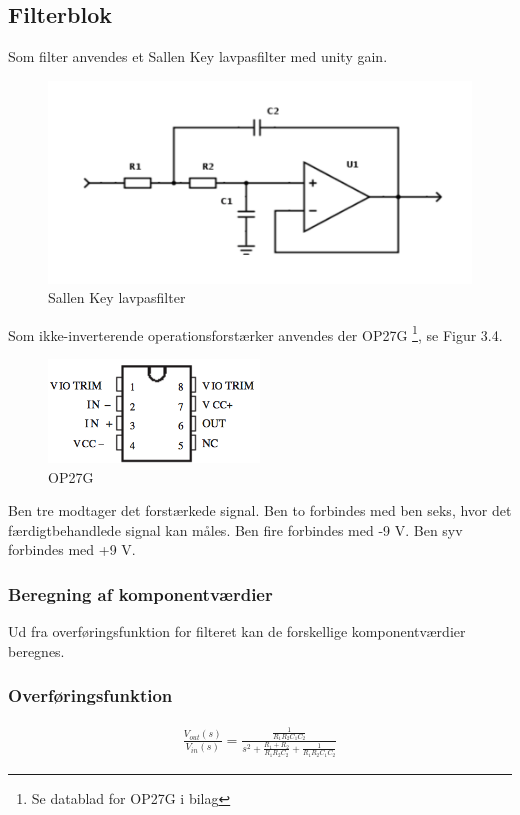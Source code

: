 \subsection{Filterblok}
Som filter anvendes et Sallen Key lavpasfilter med unity gain.

\begin{figure}[H]
	\centering
	\includegraphics[width=1\textwidth]{Figurer/Snip20151117_105}
	\caption{Sallen Key lavpasfilter}
\end{figure}

Som ikke-inverterende operationsforstærker anvendes der OP27G \footnote{Se datablad for OP27G i bilag}, se Figur 3.4. 

\begin{figure}[H]
	\centering
	\includegraphics[width=0.5\textwidth]{Figurer/Snip20151207_49}
	\caption{OP27G}
\end{figure}

Ben tre modtager det forstærkede signal. Ben to forbindes med ben seks, hvor det færdigtbehandlede signal kan måles. Ben fire forbindes med -9 V. Ben syv forbindes med +9 V.  


\subsubsection{Beregning af komponentværdier}
Ud fra overføringsfunktion for filteret kan de forskellige komponentværdier beregnes. 

\subsubsection{Overføringsfunktion}
\begin{align}
	\frac{V_{out}(s)}{V_{in}(s)}=\frac{\frac{1}{R_1R_2C_1C_2}}{s^2+\frac{R_1+R_2}{R_1R_2C_2}+\frac{1}{R_1R_2C_1C_2}}
\end{align}

